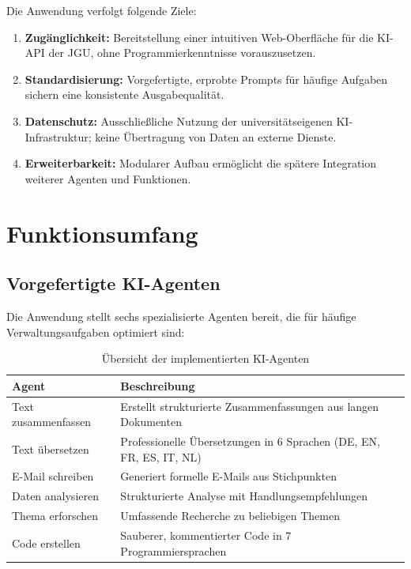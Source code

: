 \documentclass[12pt, a4paper]{article}
\begin{document}
Die Anwendung verfolgt folgende Ziele:

\begin{enumerate}[leftmargin=1.5cm]
  \item \textbf{Zugänglichkeit:} Bereitstellung einer intuitiven Web-Oberfläche für die KI-API der JGU, ohne Programmierkenntnisse vorauszusetzen.
  \item \textbf{Standardisierung:} Vorgefertigte, erprobte Prompts für häufige Aufgaben sichern eine konsistente Ausgabequalität.
  \item \textbf{Datenschutz:} Ausschließliche Nutzung der universitätseigenen KI-Infrastruktur; keine Übertragung von Daten an externe Dienste.
  \item \textbf{Erweiterbarkeit:} Modularer Aufbau ermöglicht die spätere Integration weiterer Agenten und Funktionen.
\end{enumerate}

\section{Funktionsumfang}

\subsection{Vorgefertigte KI-Agenten}

Die Anwendung stellt sechs spezialisierte Agenten bereit, die für häufige Verwaltungsaufgaben optimiert sind:

\begin{table}[h]
  \centering
  \begin{tabular}{lp{9cm}}
    \toprule
    \textbf{Agent} & \textbf{Beschreibung} \\
    \midrule
    Text zusammenfassen  & Erstellt strukturierte Zusammenfassungen aus langen Dokumenten \\
    Text übersetzen      & Professionelle Übersetzungen in 6 Sprachen (DE, EN, FR, ES, IT, NL) \\
    E-Mail schreiben     & Generiert formelle E-Mails aus Stichpunkten \\
    Daten analysieren    & Strukturierte Analyse mit Handlungsempfehlungen \\
    Thema erforschen     & Umfassende Recherche zu beliebigen Themen \\
    Code erstellen       & Sauberer, kommentierter Code in 7 Programmiersprachen \\
    \bottomrule
  \end{tabular}
  \caption{Übersicht der implementierten KI-Agenten}
\end{table}
\end{document}
